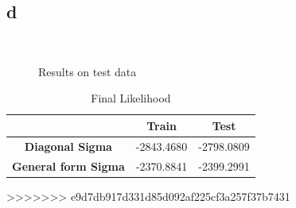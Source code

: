 \documentclass[12pt]{article}
\begin{document}
\subsection*{d}
\begin{figure} [H]
\centering
   \\
  \caption{Results on test data} 
  \label{fig:3d}
\end{figure}

\begin{table}[H]
\centering
	\begin{tabular}{c|c|c|} 
	\cline{2-3}
	& \multicolumn{1}{c|}{\cellcolor[gray]{0.7} \textbf{Train}}  
	& \multicolumn{1}{c|}{\cellcolor[gray]{0.7} \textbf{Test}}
	\\ \hline
	
	\multicolumn{1}{|c|}{\cellcolor[gray]{0.8} \textbf{Diagonal Sigma}}   & -2843.4680 & -2798.0809 \\ \hline
	\multicolumn{1}{|c|}{\cellcolor[gray]{0.8} \textbf{General form Sigma}}   & -2370.8841
	 & -2399.2991 \\ \hline
	
	\end{tabular} 
	\caption{Final Likelihood}
	\label{tab:Likelihood}
\end{table}

>>>>>>> e9d7db917d331d85d092af225cf3a257f37b7431
\end{document}
